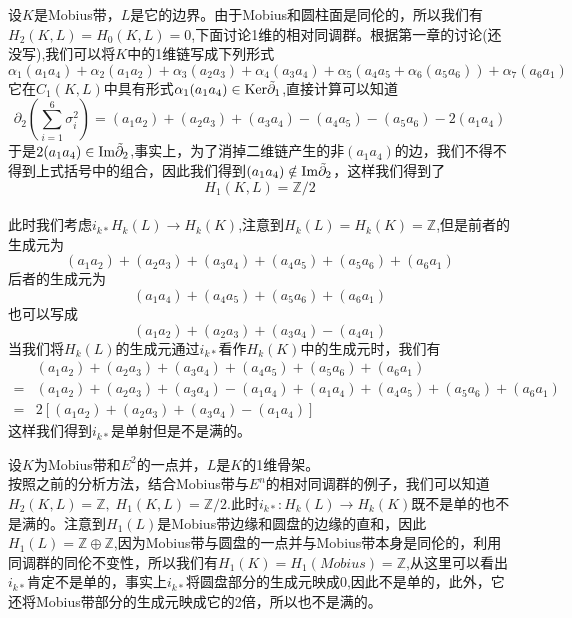   \begin{example}
  设$K$是Mobius带，$L$是它的边界。由于Mobius和圆柱面是同伦的，所以我们有$H_{2}(K,L)=H_{0}(K,L)=0$,下面讨论1维的相对同调群。根据第一章的讨论(还没写),我们可以将$K$中的1维链写成下列形式$$\alpha_{1}(a_{1}a_{4})+\alpha_{2}(a_{1}a_{2})+\alpha_{3}(a_{2}a_{3})+\alpha_{4}(a_{3}a_{4})+\alpha_{5}(a_{4}a_{5}+\alpha_{6}(a_{5}a_{6}))+\alpha_{7}(a_{6}a_{1})$$
  它在$C_{1}(K,L)$中具有形式$\alpha_{1}(a_{1}a_{4})\in {\rm Ker}\tilde{\partial}_{1}$,直接计算可以知道
  \begin{equation}
      \partial_{2}\left(\sum\limits_{i=1}^{6}\sigma_{i}^{2}\right)=(a_{1}a_{2})+(a_{2}a_{3})+(a_{3}a_{4})-(a_{4}a_{5})-(a_{5}a_{6})-2(a_{1}a_{4})
  \end{equation}
  于是$2(a_{1}a_{4})\in {\rm Im} \tilde{\partial}_{2}$,事实上，为了消掉二维链产生的非$(a_{1}a_{4})$的边，我们不得不得到上式括号中的组合，因此我们得到$(a_{1}a_{4})\notin {\rm Im}\tilde{\partial}_{2}$，这样我们得到了$$H_{1}(K,L)=\mathbb{Z}/2$$\\
  此时我们考虑$i_{k*}H_{k}(L)\rightarrow H_{k}(K)$,注意到$H_{k}(L)=H_{k}(K)=\mathbb{Z}$,但是前者的生成元为$$(a_{1}a_{2})+(a_{2}a_{3})+(a_{3}a_{4})+(a_{4}a_{5})+(a_{5}a_{6})+(a_{6}a_{1})$$后者的生成元为$$(a_{1}a_{4})+(a_{4}a_{5})+(a_{5}a_{6})+(a_{6}a_{1})$$也可以写成$$(a_{1}a_{2})+(a_{2}a_{3})+(a_{3}a_{4})-(a_{4}a_{1})$$当我们将$H_{k}(L)$的生成元通过$i_{k*}$看作$H_{k}(K)$中的生成元时，我们有
  \begin{equation}
      \begin{aligned}
        &(a_{1}a_{2})+(a_{2}a_{3})+(a_{3}a_{4})+(a_{4}a_{5})+(a_{5}a_{6})+(a_{6}a_{1})\\
        =&(a_{1}a_{2})+(a_{2}a_{3})+(a_{3}a_{4})-(a_{1}a_{4})+(a_{1}a_{4})+(a_{4}a_{5})+(a_{5}a_{6})+(a_{6}a_{1})\\
        =&2[(a_{1}a_{2})+(a_{2}a_{3})+(a_{3}a_{4})-(a_{1}a_{4})]
      \end{aligned}
  \end{equation}
      这样我们得到$i_{k*}$是单射但是不是满的。
 \end{example}
  \begin{example}
  设$K$为Mobius带和$E^{2}$的一点并，$L$是$K$的1维骨架。\\
  按照之前的分析方法，结合Mobius带与$E^{n}$的相对同调群的例子，我们可以知道$H_{2}(K,L)=\mathbb{Z},\;H_{1}(K,L)=\mathbb{Z}/2$.此时$i_{k*}:H_{k}(L)\rightarrow H_{k}(K)$既不是单的也不是满的。注意到$H_{1}(L)$是Mobius带边缘和圆盘的边缘的直和，因此$H_{1}(L)=\mathbb{Z}\oplus\mathbb{Z}$,因为Mobius带与圆盘的一点并与Mobius带本身是同伦的，利用同调群的同伦不变性，所以我们有$H_{1}(K)=H_{1}(Mobius)=\mathbb{Z}$,从这里可以看出$i_{k*}$肯定不是单的，事实上$i_{k*}$将圆盘部分的生成元映成0,因此不是单的，此外，它还将Mobius带部分的生成元映成它的2倍，所以也不是满的。
  \end{example}
